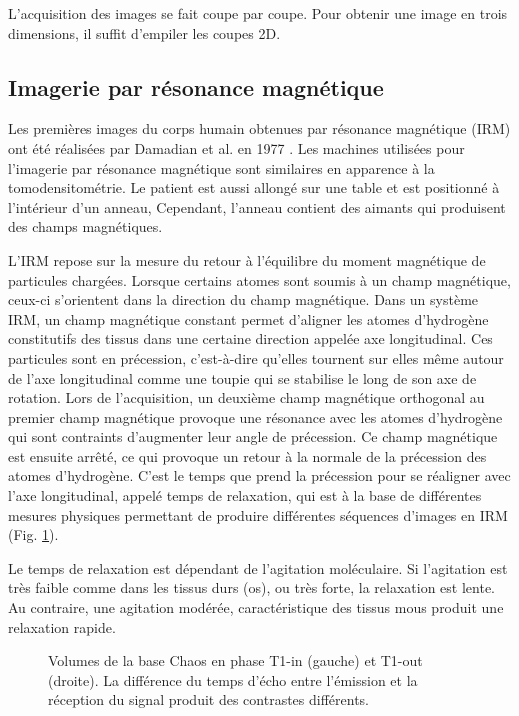 L'acquisition des images se fait coupe par coupe. Pour obtenir une image en trois dimensions, il suffit d'empiler les coupes 2D.

\subsection{Imagerie par résonance magnétique}
\label{sec:contexte:images:irm}

Les premières images du corps humain obtenues par résonance magnétique (IRM) ont été réalisées par Damadian et al. en 1977 \cite{Damadian1977_NMRI}. Les machines utilisées pour l'imagerie par résonance magnétique sont similaires en apparence à la tomodensitométrie. Le patient est aussi allongé sur une table et est positionné à l'intérieur d'un anneau, Cependant, l'anneau contient des aimants qui produisent des champs magnétiques.

L'IRM repose sur la mesure du retour à l'équilibre du moment magnétique de particules chargées. Lorsque certains atomes sont soumis à un champ magnétique, ceux-ci s'orientent dans la direction du champ magnétique. Dans un système IRM, un champ magnétique constant permet d'aligner les atomes d'hydrogène constitutifs des tissus dans une certaine direction appelée axe longitudinal. Ces particules sont en précession, c'est-à-dire qu'elles tournent sur elles même autour de l'axe longitudinal comme une toupie qui se stabilise le long de son axe de rotation. Lors de l'acquisition, un deuxième champ magnétique orthogonal au premier champ magnétique provoque une résonance avec les atomes d'hydrogène qui sont contraints d'augmenter leur angle de précession. Ce champ magnétique est ensuite arrêté, ce qui provoque un retour à la normale de la précession des atomes d'hydrogène. C'est le temps que prend la précession pour se réaligner avec l'axe longitudinal, appelé temps de relaxation, qui est à la base de différentes mesures physiques permettant de produire différentes séquences d'images en IRM (Fig. \ref{fig:T1_MRI}).

Le temps de relaxation est dépendant de l'agitation moléculaire. Si l'agitation est très faible comme dans les tissus durs (os), ou très forte, la relaxation est lente. Au contraire, une agitation modérée, caractéristique des tissus mous produit une relaxation rapide.

\begin{figure}
    \centering
    \caption{Volumes de la base Chaos en phase T1-in (gauche) et T1-out (droite). La différence du temps d'écho entre l'émission et la réception du signal produit des contrastes différents.}
    \label{fig:T1_MRI}
\end{figure}

